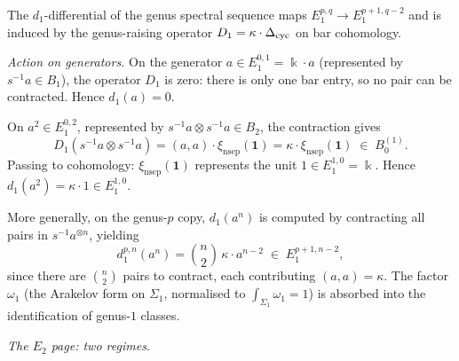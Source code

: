 \begin{computation}
\label{comp:heis-d1-differential}
The $d_1$-differential of the genus spectral sequence maps
$E_1^{p,q} \to E_1^{p+1,q-2}$ and is induced by the genus-raising
operator $D_1 = \kappa \cdot \Delta_{\mathrm{cyc}}$ on bar cohomology.

\medskip\noindent
\emph{Action on generators.}
On the generator $a \in E_1^{0,1} = \Bbbk \cdot a$
(represented by $s^{-1}a \in B_1$), the operator $D_1$ is
zero: there is only one bar entry, so no pair can be contracted.
Hence $d_1(a) = 0$.

On $a^2 \in E_1^{0,2}$, represented by
$s^{-1}a \otimes s^{-1}a \in B_2$, the contraction gives
\[
 D_1(s^{-1}a \otimes s^{-1}a)
 = (a, a) \cdot \xi_{\mathrm{nsep}}(\mathbf{1})
 = \kappa \cdot \xi_{\mathrm{nsep}}(\mathbf{1})
 \;\in\; B_0^{(1)}.
\]
Passing to cohomology: $\xi_{\mathrm{nsep}}(\mathbf{1})$
represents the unit $1 \in E_1^{1,0} = \Bbbk$. Hence
$d_1(a^2) = \kappa \cdot 1 \in E_1^{1,0}$.

More generally, on the genus-$p$ copy, $d_1(a^n)$ is computed by
contracting all pairs in $s^{-1}a^{\otimes n}$, yielding
\begin{equation}\label{eq:heis-d1-formula}
 d_1^{p,n}(a^n) = \binom{n}{2}\, \kappa \cdot a^{n-2}
 \;\in\; E_1^{p+1, n-2},
\end{equation}
since there are $\binom{n}{2}$ pairs to contract, each
contributing $(a,a) = \kappa$. The factor
$\omega_1$ (the Arakelov form on $\Sigma_1$, normalised to
$\int_{\Sigma_1}\omega_1 = 1$) is absorbed into the
identification of genus-$1$ classes.

\medskip\noindent
\emph{The $E_2$ page: two regimes.}


\end{computation}
